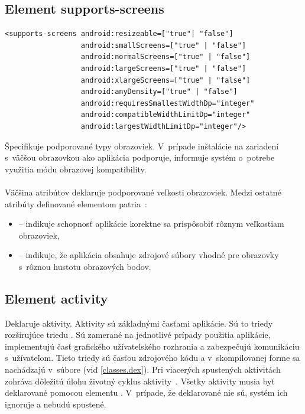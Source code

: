 \subsection{Element supports-screens}
\lstset{language=XML}
\begin{lstlisting}
<supports-screens android:resizeable=["true"| "false"]
                  android:smallScreens=["true" | "false"]
                  android:normalScreens=["true" | "false"]
                  android:largeScreens=["true" | "false"]
                  android:xlargeScreens=["true" | "false"]
                  android:anyDensity=["true" | "false"]
                  android:requiresSmallestWidthDp="integer"
                  android:compatibleWidthLimitDp="integer"
                  android:largestWidthLimitDp="integer"/>
\end{lstlisting}
Špecifikuje podporované typy obrazoviek. V~prípade inštalácie na zariadení s~väčšou obrazovkou ako aplikácia podporuje, informuje systém o~potrebe využitia módu obrazovej kompatibility.\\\\ Väčšina atribútov deklaruje podporované veľkosti obrazoviek. Medzi ostatné atribúty definované elementom  patria~\cite{elScreen}:\\
\begin{itemize}
\item {} -- indikuje schopnosť aplikácie korektne sa prispôsobiť rôznym veľkostiam obrazoviek,
\item {} -- indikuje, že aplikácia obsahuje zdrojové súbory vhodné pre obrazovky s~rôznou hustotu obrazových bodov.
\end{itemize}

\subsection{Element activity}
\label{el_activity}
Deklaruje aktivity. Aktivity sú základnými časťami aplikácie. Sú to triedy rozširujúce triedu . Sú zamerané na jednotlivé prípady použitia aplikácie, implementujú časť grafického užívateľského rozhrania a zabezpečujú komunikáciu s~užívateľom. Tieto triedy sú časťou zdrojového kódu a v~skompilovanej forme sa nachádzajú v~súbore  (viď \ref{classes.dex}). Pri viacerých spustených aktivitách zohráva dôležitú úlohu životný cyklus aktivity~\cite{elActivity}. Všetky aktivity musia byť deklarované pomocou elementu . V~prípade, že deklarované nie sú, systém ich ignoruje a nebudú spustené.

